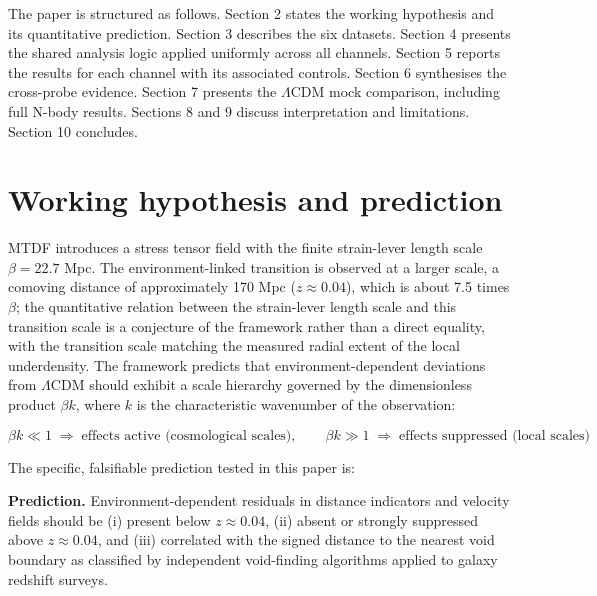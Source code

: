 \documentclass[11pt,a4paper]{article}
\begin{document}
The paper is structured as follows. Section 2 states the working hypothesis and its quantitative prediction. Section 3 describes the six datasets. Section 4 presents the shared analysis logic applied uniformly across all channels. Section 5 reports the results for each channel with its associated controls. Section 6 synthesises the cross-probe evidence. Section 7 presents the \(\Lambda\)CDM mock comparison, including full N-body results. Sections 8 and 9 discuss interpretation and limitations. Section 10 concludes.

\section{Working hypothesis and prediction}
\label{sec:sec2}
MTDF introduces a stress tensor field with the finite strain-lever length scale \(\beta = 22.7\) Mpc. The environment-linked transition is observed at a larger scale, a comoving distance of approximately 170 Mpc (\(z \approx 0.04\)), which is about 7.5 times \(\beta\); the quantitative relation between the strain-lever length scale and this transition scale is a conjecture of the framework rather than a direct equality, with the transition scale matching the measured radial extent of the local underdensity. The framework predicts that environment-dependent deviations from \(\Lambda\)CDM should exhibit a scale hierarchy governed by the dimensionless product \(\beta k\), where \(k\) is the characteristic wavenumber of the observation:

\[
\beta k \ll 1 \;\Rightarrow\; \text{effects active (cosmological scales)}, \qquad
\beta k \gg 1 \;\Rightarrow\; \text{effects suppressed (local scales)}
\]

The specific, falsifiable prediction tested in this paper is:

\begin{mdframed}[linecolor=accent,linewidth=0.5pt,backgroundcolor=callout-bg,leftline=true,rightline=true,topline=true,bottomline=true,innerleftmargin=8pt,innerrightmargin=8pt,innertopmargin=6pt,innerbottommargin=6pt]
\textbf{Prediction.} Environment-dependent residuals in distance indicators and velocity fields should be (i) present below \(z \approx 0.04\), (ii) absent or strongly suppressed above \(z \approx 0.04\), and (iii) correlated with the signed distance to the nearest void boundary as classified by independent void-finding algorithms applied to galaxy redshift surveys.
\end{mdframed}
\end{document}
